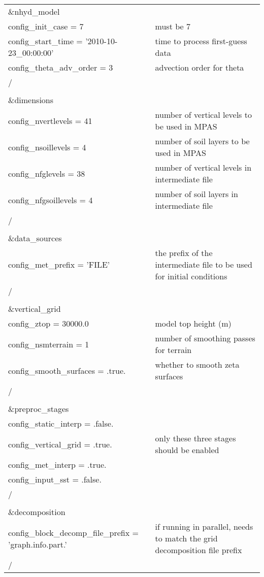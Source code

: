 \begin{longtable}{p{3.0in} |p{3.25in}}

\&nhyd\_model\\
   config\_init\_case       = 7                      & must be 7 \\
   config\_start\_time      = '2010-10-23\_00:00:00' & time to process first-guess data \\
   config\_theta\_adv\_order = 3                     & advection order for theta \\
/\\
\\
\&dimensions\\
   config\_nvertlevels     = 41                      & number of vertical levels to be used in MPAS \\
   config\_nsoillevels     = 4                       & number of soil layers to be used in MPAS \\
   config\_nfglevels       = 38                      & number of vertical levels in intermediate file \\
   config\_nfgsoillevels   = 4                       & number of soil layers in intermediate file \\
/\\
\\
\&data\_sources\\
   config\_met\_prefix      = 'FILE'                 & the prefix of the intermediate file to be used for initial conditions \\
/\\
\\
\&vertical\_grid\\
   config\_ztop            = 30000.0                 & model top height (m) \\
   config\_nsmterrain      = 1                       & number of smoothing passes for terrain \\
   config\_smooth\_surfaces = .true.                 & whether to smooth zeta surfaces \\
/\\
\\
\&preproc\_stages                                    & \\
   config\_static\_interp   = .false.                & \\
   config\_vertical\_grid   = .true.                 & only these three stages should be enabled \\
   config\_met\_interp      = .true.                 & \\
   config\_input\_sst       = .false.                & \\
/\\
\\
\&decomposition\\
   config\_block\_decomp\_file\_prefix = 'graph.info.part.' & if running in parallel, needs to match the grid decomposition file prefix \\
/\\
\end{longtable}

